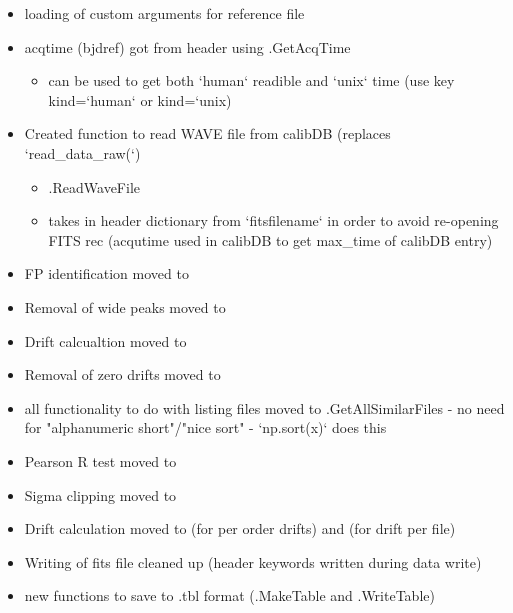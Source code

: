 \begin{itemize}
\item loading of custom arguments for reference file

\item acqtime (bjdref) got from header using \spirouImage.GetAcqTime
	\begin{itemize}
	\item can be used to get both `human` readible and `unix` time (use key kind=`human` or kind=`unix)
	\end{itemize}

\item Created function to read WAVE file from calibDB (replaces `read\_data\_raw(`)
	\begin{itemize}
	\item \spirouImage.ReadWaveFile
	\item takes in header dictionary from `fitsfilename` in order to avoid re-opening FITS rec (acqutime used in calibDB to get max\_time of calibDB entry) 
	\end{itemize}

\item FP identification moved to 

\item Removal of wide peaks moved to 

\item Drift calcualtion moved to 

\item Removal of zero drifts moved to 

\item all functionality to do with listing files moved to \spirouImage{\hskip 0pt}.GetAllSimilarFiles - no need for "alphanumeric short"/"nice sort" - `np.sort(x)` does this
    
\item Pearson R test moved to 

\item Sigma clipping moved to 

\item Drift calculation moved to  (for per order drifts) and  (for drift per file)

\item Writing of fits file cleaned up (header keywords written during data write)

\item new functions to save to .tbl format (\spirouImage.MakeTable and \spirouImage.WriteTable)

\end{itemize}


